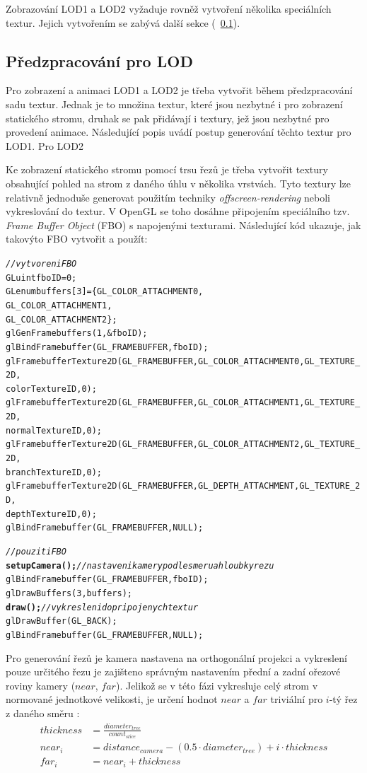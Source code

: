 Zobrazování LOD1 a LOD2 vyžaduje rovněž vytvoření několika speciálních textur. Jejich vytvořením se zabývá další sekce (~\ref{sec:preprocessLOD}).


\subsection{Předzpracování pro LOD}
\label{sec:preprocessLOD}
Pro zobrazení a animaci LOD1 a LOD2 je třeba vytvořit během předzpracování sadu textur. Jednak je to množina textur, které jsou nezbytné i pro zobrazení statického stromu, druhak se pak přidávají i textury, jež jsou nezbytné pro provedení animace. Následující popis uvádí postup generování těchto textur pro LOD1. Pro LOD2

Ke zobrazení statického stromu pomocí trsu řezů je třeba vytvořit textury obsahující pohled na strom z daného úhlu v několika vrstvách. Tyto textury lze relativně jednoduše generovat použitím techniky \emph{offscreen-rendering} neboli vykreslování do textur. V OpenGL se toho dosáhne připojením speciálního tzv. \emph{Frame Buffer Object} (FBO) s napojenými texturami. Následující kód ukazuje, jak takovýto FBO vytvořit a použít:
\pagebreak
\begin{alltt}
\textit{// vytvoreni FBO}
GLuint	fboID = 0;
GLenum buffers[3] = \{ GL_COLOR_ATTACHMENT0,
                      GL_COLOR_ATTACHMENT1,
                      GL_COLOR_ATTACHMENT2 \};
glGenFramebuffers(1, &fboID);
glBindFramebuffer(GL_FRAMEBUFFER, fboID);
   glFramebufferTexture2D(GL_FRAMEBUFFER, GL_COLOR_ATTACHMENT0, GL_TEXTURE_2D,
                          colorTextureID, 0);
   glFramebufferTexture2D(GL_FRAMEBUFFER, GL_COLOR_ATTACHMENT1, GL_TEXTURE_2D,
                          normalTextureID, 0);
   glFramebufferTexture2D(GL_FRAMEBUFFER, GL_COLOR_ATTACHMENT2, GL_TEXTURE_2D, 
                          branchTextureID, 0);
   glFramebufferTexture2D(GL_FRAMEBUFFER, GL_DEPTH_ATTACHMENT, GL_TEXTURE_2D, 
                          depthTextureID, 0);
glBindFramebuffer(GL_FRAMEBUFFER, NULL);

\textit{// pouziti FBO}
{\bf setupCamera();}      \textit{// nastaveni kamery podle smeru a hloubky rezu}
glBindFramebuffer(GL_FRAMEBUFFER, fboID);
      glDrawBuffers(3, buffers);			
           {\bf draw();}     \textit{// vykresleni do pripojenych textur}
      glDrawBuffer(GL_BACK);
glBindFramebuffer(GL_FRAMEBUFFER, NULL);
\end{alltt}

Pro generování řezů je kamera nastavena na orthogonální projekci a vykreslení pouze určitého řezu je zajišteno správným nastavením přední a zadní ořezové roviny kamery ($near$, $far$). Jelikož se v této fázi vykresluje celý strom v normované jednotkové velikosti, je určení hodnot $near$ a $far$ triviální pro $i$-tý řez z daného směru : 
\begin{align}
thickness &= \frac {diameter_{tree}}{count_{slice}}\nonumber \\
near_i &= distance_{camera}-(0.5 \cdot diameter_{tree}) + i \cdot thickness \nonumber\\
far_i &= near_i + thickness
\end{align}

